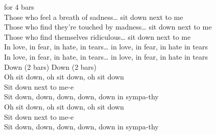  for 4 bars\\
 Those who feel a breath of sadness…  sit down next to  me\\
 Those who find they're touched by madness…  sit down next to  me\\
 Those who find themselves ridiculous…  sit down next to  me\\
In  love, in fear, in hate, in tears… in  love, in fear, in  hate in tears\\
In  love, in fear, in hate, in tears… in  love, in fear, in  hate in tears\\
 Down  (2 bars)     Down  (2 bars)   \\
Oh sit  down, oh sit down, oh sit down\\
 Sit down next to  me-e\\
Sit  down, down, down, down, down  in sympa-thy\\
Oh sit  down, oh sit down, oh sit down\\
 Sit down next to  me-e\\
Sit  down, down, down, down, down  in sympa-thy\\

